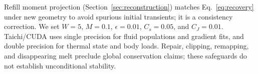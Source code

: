 \begin{enumerate}


\end{enumerate}

Refill moment projection (Section~\ref{sec:reconstruction}) matches
Eq.~\eqref{eq:recovery} under new geometry to avoid spurious initial transients;
it is a consistency correction. We set $W=5$,
$M=0.1$, $\epsilon=0.01$, $C_s=0.05$, and $C_J=0.01$.
Taichi/CUDA \citep{Hu2019} uses single precision for fluid populations and
gradient fits, and double precision for thermal state and body loads.
Repair, clipping, remapping, and disappearing melt preclude global
conservation claims; these safeguards do not establish unconditional stability.
